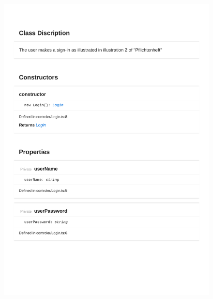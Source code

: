 \begin{figure}[H]
\centerline{\includegraphics[width=1\textwidth]{FrontendDocsAsPDF/Model/Login.pdf}}
\end{figure}

